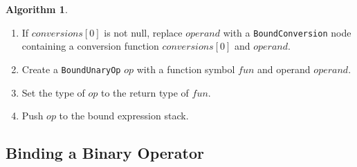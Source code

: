 \documentclass[a4paper,oneside,11pt]{book}
\theoremstyle{definition}
\newtheorem{algo}{Algorithm}[section]
\begin{document}
\begin{algo}
\begin{enumerate}
If resolution did not succeed,
\begin{enumerate}
\item
Let $freeFunArgs$ be a list of argument information structures (\ref{arginfo}).
\item
Add $t$ and argument category of $t$ to $freeFunArgs$.
\item
Let $freeFunLookups$ be a list of scope lookups.
\item
Add $<$container scope, \verb|this| $|$ \verb|base| $|$ \verb|parent|$>$ to $freeFunLookups$.
\item
Add $<$namespace scope of $t$, \verb|this| $|$ \verb|base| $|$ \verb|parent|$>$ to $freeFunLookups$.
\item
Add $<$file scope, \verb|file|$>$ to $freeFunLookups$.
\item
Call overload resolution algorithm \ref{resolveoverload} with the group name of the unary operator function, $freeFunArgs$, $freeFunLookups$ and $conversions$.
\item
Set $fun$ to a function symbol resolved.
\end{enumerate}
\item
If $conversions[0]$ is not null, replace $operand$ with a \verb|BoundConversion| node containing a conversion function $conversions[0]$ and $operand$.
\item
Create a \verb|BoundUnaryOp| $op$ with a function symbol $fun$ and operand $operand$.
\item
Set the type of $op$ to the return type of $fun$.
\item
Push $op$ to the bound expression stack.
\end{enumerate}
\end{algo}

\subsection{Binding a Binary Operator}
\end{document}
